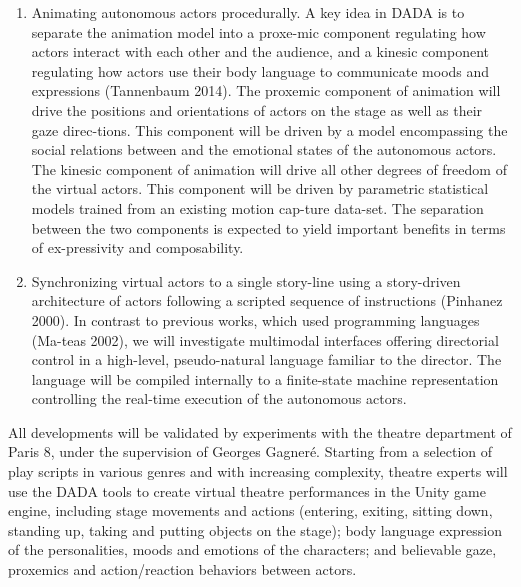 \begin{enumerate}
\item	Animating autonomous actors procedurally. A key idea in DADA is to separate the animation model into a proxe-mic component regulating how actors interact with each other and the audience, and a kinesic component regulating how actors use their body language to communicate moods and expressions (Tannenbaum 2014). The proxemic component of animation will drive the positions and orientations of actors on the stage as well as their gaze direc-tions. This component will be driven by a model encompassing the social relations between and the emotional states of the autonomous actors. The kinesic component of animation will drive all other degrees of freedom of the virtual actors. This component will be driven by parametric statistical models trained from an existing motion cap-ture data-set. The separation between the two components is expected to yield important benefits in terms of ex-pressivity and composability.
\item 	Synchronizing virtual actors to a single story-line using a story-driven architecture of actors following a scripted sequence of instructions (Pinhanez 2000). In contrast to previous works, which used programming languages (Ma-teas 2002), we will investigate multimodal interfaces offering directorial control in a high-level, pseudo-natural language familiar to the director. The language will be compiled internally to a finite-state machine representation controlling the real-time execution of the autonomous actors. 
\end{enumerate}


All developments will be validated by experiments with the theatre department of Paris 8, under the supervision of Georges Gagner\'e. Starting from a selection of play scripts in various genres and with increasing complexity, theatre experts will use the DADA tools to create virtual theatre performances in the Unity game engine, including stage movements and actions (entering, exiting, sitting down, standing up, taking and putting objects on the stage); body language expression of the personalities, moods and emotions of the characters; and believable gaze, proxemics and action/reaction behaviors between actors.

